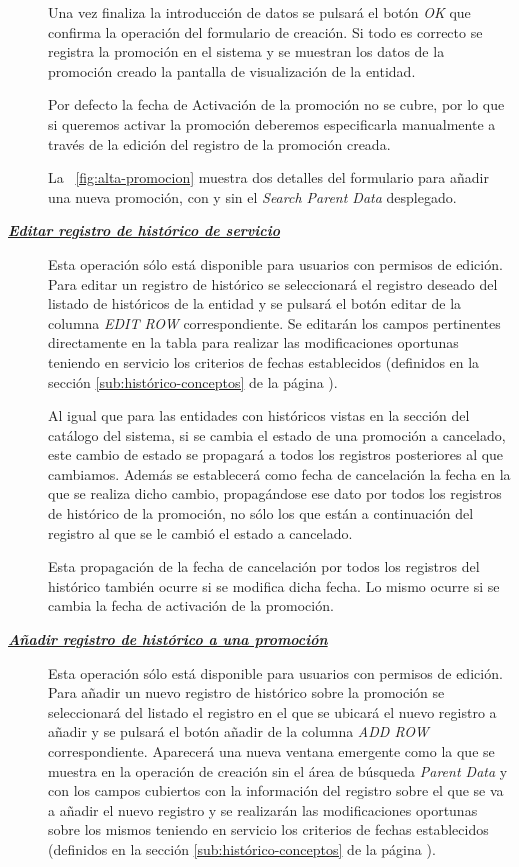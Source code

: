 \begin{description}
Una vez finaliza la introducción de datos se pulsará el botón \emph{OK} que confirma la operación del formulario de creación. Si todo es correcto se registra la promoción en el sistema y se muestran los datos de la promoción creado la pantalla de visualización de la entidad.

Por defecto la fecha de Activación de la promoción no se cubre, por lo que si queremos activar la promoción deberemos especificarla manualmente a través de la edición del registro de la promoción creada.

La \figurename~\ref{fig:alta-promocion} muestra dos detalles del formulario para añadir una nueva promoción, con y sin el \emph{Search Parent Data} desplegado.

\item[\underline{\textsl{\textbf{Editar registro de histórico de servicio}}}] Esta operación sólo está disponible para usuarios con permisos de edición.
Para editar un registro de histórico se seleccionará el registro deseado del listado de históricos de la entidad y se pulsará el botón editar de la columna \textit{EDIT ROW} correspondiente. Se editarán los campos pertinentes directamente en la tabla para realizar las modificaciones oportunas teniendo en servicio los criterios de fechas establecidos (definidos en la sección \ref{sub:histórico-conceptos} de la página \pageref{sub:histórico-conceptos}).

Al igual que para las entidades con históricos vistas en la sección del catálogo del sistema, si se cambia el estado de una promoción a cancelado, este cambio de estado se propagará a todos los registros posteriores al que cambiamos. Además se establecerá como fecha de cancelación la fecha en la que se realiza dicho cambio, propagándose ese dato por todos los registros de histórico de la promoción, no sólo los que están a continuación del registro al que se le cambió el estado a cancelado.

Esta propagación de la fecha de cancelación por todos los registros del histórico  también ocurre si se modifica dicha fecha. Lo mismo ocurre si se cambia la fecha de activación de la promoción.

\item[\underline{\textsl{\textbf{Añadir registro de histórico a una promoción}}}] Esta operación sólo está disponible para usuarios con permisos de edición.
Para añadir un nuevo registro de histórico sobre la promoción se seleccionará del listado el registro en el que se ubicará el nuevo registro a añadir y se pulsará el botón añadir de la columna \textit{ADD ROW} correspondiente. Aparecerá una nueva ventana emergente como la que se muestra en la operación de creación sin el área de búsqueda \emph{Parent Data} y con los campos cubiertos con la información del registro sobre el que se va a añadir el nuevo registro y se realizarán las modificaciones oportunas sobre los mismos teniendo en servicio los criterios de fechas establecidos (definidos en la sección \ref{sub:histórico-conceptos} de la página \pageref{sub:histórico-conceptos}).


\end{description}
